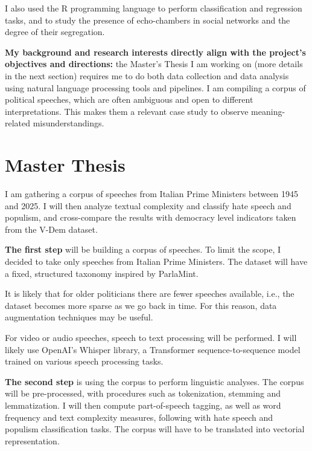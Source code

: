 \documentclass[12pt,a4paper,sans]{moderncv} %
\begin{document}
I also used the R programming language to perform classification and regression tasks, and to study the presence of echo-chambers in social networks and the degree of their segregation.

\vspace{2mm}

\textbf{My background and research interests directly align with the project's objectives and directions:} the Master's Thesis I am working on (more details in the next section) requires me to do both data collection and data analysis using natural language processing tools and pipelines. I am compiling a corpus of political speeches, which are often ambiguous and open to different interpretations. This makes them a relevant case study to observe meaning-related misunderstandings.


\section{Master Thesis}
 
I am gathering a corpus of speeches from Italian Prime Ministers between 1945 and 2025. I will then analyze textual complexity and classify hate speech and populism, and cross-compare the results with democracy level indicators taken from the V-Dem dataset.

\vspace{2mm}

\textbf{The first step} will be building a corpus of speeches. To limit the scope, I decided to take only speeches from Italian Prime Ministers. The dataset will have a fixed, structured taxonomy inspired by ParlaMint.

It is likely that for older politicians there are fewer speeches available, i.e., the dataset becomes more sparse as we go back in time. For this reason, data augmentation techniques may be useful.

For video or audio speeches, speech to text processing will be performed. I will likely use OpenAI's Whisper library, a Transformer sequence-to-sequence model trained on various speech processing tasks. 

\vspace{2mm}

\textbf{The second step} is using the corpus to perform linguistic analyses. The corpus will be pre-processed, with procedures such as tokenization, stemming and lemmatization. I will then compute part-of-speech tagging, as well as word frequency and text complexity measures, following with hate speech and populism classification tasks. The corpus will have to be translated into vectorial representation.
\end{document}
